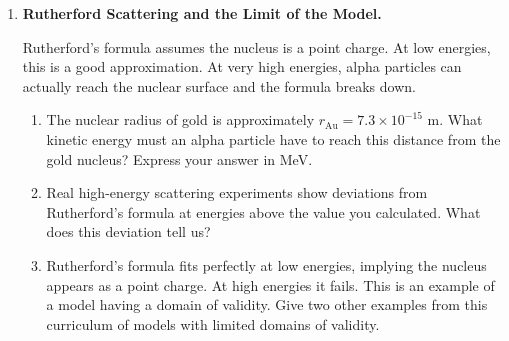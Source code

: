 \documentclass[12pt, a4paper]{book}
\theoremstyle{definition}
\begin{document}
\begin{deepbox}
\begin{enumerate}[label=\textbf{D\arabic*.}]
        \begin{enumerate}[label=(\alph*)]
          \item Calculate the electrostatic repulsive force
                between two protons separated by
                $r = 2\times10^{-15}$ m.
          \item Convert this force to newtons.
                Comment on its magnitude.
          \item Protons clearly \emph{do} stay in the nucleus.
                This means there must be an attractive force
                stronger than the electrostatic repulsion at
                this range.
                This is the \emph{strong nuclear force}.
                From the force calculation in (a), what can
                you infer about the minimum strength of the
                strong nuclear force at nuclear distances?
          \item The strong nuclear force has a very short range ---
                it drops to essentially zero beyond about
                $2\times10^{-15}$ m.
                Explain qualitatively why this means that very
                large nuclei ($A > 200$) become unstable.
                (Hint: what happens to the electrostatic repulsion
                as the nucleus grows, while the strong force
                stays short-range?)
        \end{enumerate}

  \item \textbf{Rutherford Scattering and the Limit of the Model.}

        Rutherford's formula assumes the nucleus is a point charge.
        At low energies, this is a good approximation.
        At very high energies, alpha particles can actually
        reach the nuclear surface and the formula breaks down.

        \begin{enumerate}[label=(\alph*)]
          \item The nuclear radius of gold is approximately
                $r_{\text{Au}} = 7.3\times10^{-15}$ m.
                What kinetic energy must an alpha particle have
                to reach this distance from the gold nucleus?
                Express your answer in MeV.
          \item Real high-energy scattering experiments show
                deviations from Rutherford's formula at energies
                above the value you calculated.
                What does this deviation tell us?
          \item Rutherford's formula fits perfectly at low energies,
                implying the nucleus appears as a point charge.
                At high energies it fails.
                This is an example of a model having a domain
                of validity.
                Give two other examples from this curriculum
                of models with limited domains of validity.
        \end{enumerate}

\end{enumerate}
\end{deepbox}
\end{document}
